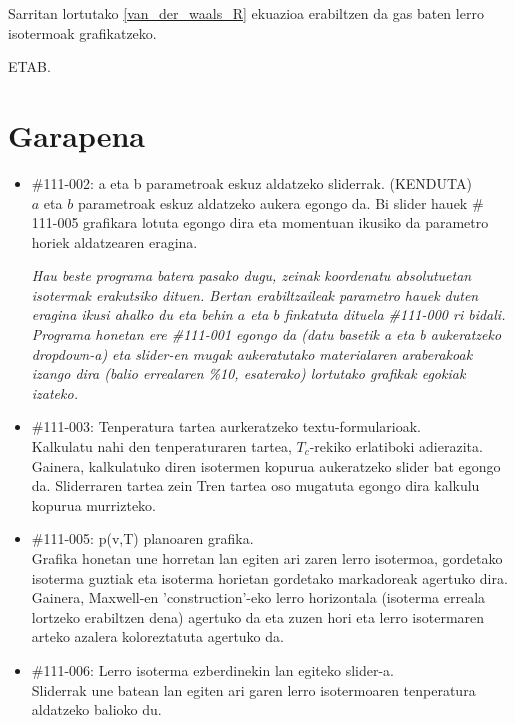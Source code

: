 \documentclass[10pt,a4paper]{article}
\let\nf\normalfont %
\newcommand{\cf}{\normalfont\sffamily}
\begin{document}
Sarritan lortutako \ref{van_der_waals_R} ekuazioa erabiltzen da gas baten lerro isotermoak grafikatzeko. 


ETAB. 
\section{Garapena}

\begin{itemize}

\item \cf \#111-002: a eta b parametroak eskuz aldatzeko sliderrak. (KENDUTA)
\\
\nf $a$ eta $b$ parametroak eskuz aldatzeko aukera egongo da. Bi slider hauek \cf \# 111-005 \nf grafikara lotuta egongo dira eta
momentuan ikusiko da parametro horiek aldatzearen eragina.

\textit{Hau beste programa batera pasako dugu, zeinak koordenatu absolutuetan isotermak erakutsiko dituen. Bertan erabiltzaileak parametro hauek duten eragina ikusi ahalko du eta behin $a$ eta $b$ finkatuta dituela \cf \#111-000 \nf ri bidali. Programa honetan ere \cf \#111-001 \nf egongo da (datu basetik a eta b aukeratzeko dropdown-a) eta slider-en mugak aukeratutako materialaren araberakoak izango dira (balio errealaren \%10, esaterako) lortutako grafikak egokiak izateko.}

\item \cf \#111-003: Tenperatura tartea aurkeratzeko textu-formularioak.
\\
\nf Kalkulatu nahi den tenperaturaren tartea, $T_c$-rekiko erlatiboki adierazita. Gainera, kalkulatuko diren isotermen kopurua aukeratzeko slider bat egongo da. Sliderraren tartea zein Tren tartea oso mugatuta egongo dira kalkulu kopurua murrizteko. 
\\

\item \cf \#111-005: p(v,T) planoaren grafika.
\\
\nf Grafika honetan une horretan lan egiten ari zaren lerro isotermoa, gordetako isoterma guztiak eta isoterma horietan gordetako markadoreak agertuko dira. Gainera, Maxwell-en 'construction'-eko lerro horizontala (isoterma erreala lortzeko erabiltzen dena) agertuko da eta zuzen hori eta lerro isotermaren arteko azalera koloreztatuta agertuko da.

\item \cf \#111-006: Lerro isoterma ezberdinekin lan egiteko slider-a.
\\
\nf Sliderrak une batean lan egiten ari garen lerro isotermoaren tenperatura aldatzeko balioko du.


\end{itemize}
\end{document}
